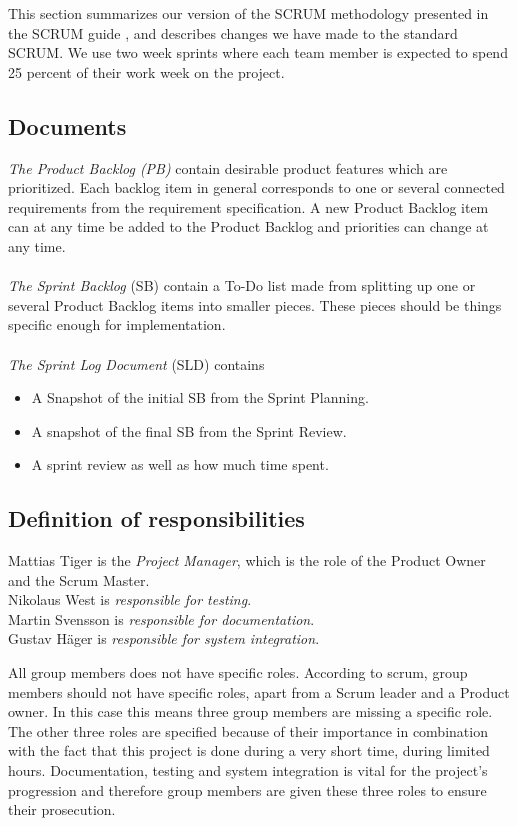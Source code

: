 
This section summarizes our version of the SCRUM methodology presented in the SCRUM guide \cite{scrumGuide}, and describes changes we have made to the standard SCRUM. We use two week sprints where each team member is expected to spend 25 percent of their work week on the project.   

\subsection{Documents}
\emph{The Product Backlog (PB)} contain desirable product features which are prioritized. Each backlog item in general corresponds to one or several connected requirements from the requirement specification.
A new Product Backlog item can at any time be added to the Product Backlog and priorities can change at any time. \\
\\
\emph{The Sprint Backlog} (SB) contain a To-Do list made from splitting up one or several Product Backlog items into smaller pieces. These pieces should be things specific enough for implementation. \\
\\
\emph{The Sprint Log Document} (SLD) contains
\begin{itemize}
  \item A Snapshot of the initial SB from the Sprint Planning.
  \item A snapshot of the final SB from the Sprint Review.
  \item A sprint review as well as how much time spent.
\end{itemize} 

\subsection{Definition of responsibilities}
Mattias Tiger is the \emph{Project Manager}, which is the role of the Product Owner and the Scrum Master.\\
Nikolaus West is \emph{responsible for testing}.\\
Martin Svensson is \emph{responsible for documentation}.\\
Gustav Häger is \emph{responsible for system integration}. 

All group members does not have specific roles. According to scrum, group members should not have specific roles, apart from a Scrum leader and a Product owner.  In this case this means three group members are missing a specific role. The other three  roles are specified because of their importance in combination with the fact that this project is done during a very short time, during limited hours.  Documentation, testing and system integration is vital for the project’s progression and therefore group members are given these three roles to ensure their prosecution.  

